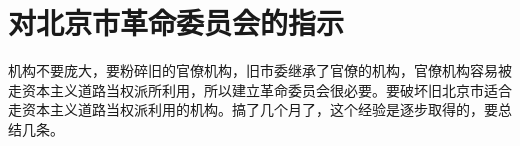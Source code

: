\section[对北京市革命委员会的指示（一九六七年五月）]{对北京市革命委员会的指示}


机构不要庞大，要粉碎旧的官僚机构，旧市委继承了官僚的机构，官僚机构容易被走资本主义道路当权派所利用，所以建立革命委员会很必要。要破坏旧北京市适合走资本主义道路当权派利用的机构。搞了几个月了，这个经验是逐步取得的，要总结几条。



